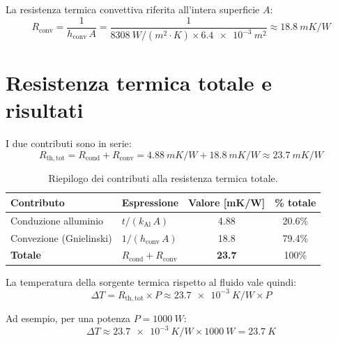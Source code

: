 \documentclass[a4paper,11pt]{article}
\begin{document}
La resistenza termica convettiva riferita all'intera superficie $A$:
\begin{equation}
  \boxed{R_{\mathrm{conv}} = \frac{1}{h_{\mathrm{conv}}\,A}
                            = \frac{1}{\SI{8308}{W/(m^2\cdot K)}\times\SI{6.4e-3}{m^2}}
                            \approx \SI{18.8}{mK/W}}
\end{equation}

\section{Resistenza termica totale e risultati}

I due contributi sono in serie:
\begin{equation}
  R_{\mathrm{th,tot}} = R_{\mathrm{cond}} + R_{\mathrm{conv}}
                      = \SI{4.88}{mK/W} + \SI{18.8}{mK/W}
                      \approx \SI{23.7}{mK/W}
\end{equation}

\begin{table}[H]
\centering
\caption{Riepilogo dei contributi alla resistenza termica totale.}
\begin{tabular}{llcc}
\toprule
Contributo & Espressione & Valore [\si{mK/W}] & \% totale \\
\midrule
Conduzione alluminio & $t/(k_{\mathrm{Al}}\,A)$         & 4.88  & 20.6\% \\
Convezione (Gnielinski) & $1/(h_{\mathrm{conv}}\,A)$     & 18.8  & 79.4\% \\
\midrule
\textbf{Totale} & $R_{\mathrm{cond}}+R_{\mathrm{conv}}$ & \textbf{23.7} & 100\% \\
\bottomrule
\end{tabular}
\end{table}

La temperatura della sorgente termica rispetto al fluido vale quindi:
\begin{equation}
  \Delta T = R_{\mathrm{th,tot}}\times P
           \approx \SI{23.7e-3}{K/W} \times P
\end{equation}

Ad esempio, per una potenza $P = \SI{1000}{W}$:
\begin{equation}
  \Delta T \approx \SI{23.7e-3}{K/W} \times \SI{1000}{W} = \SI{23.7}{K}
\end{equation}

\end{document}
